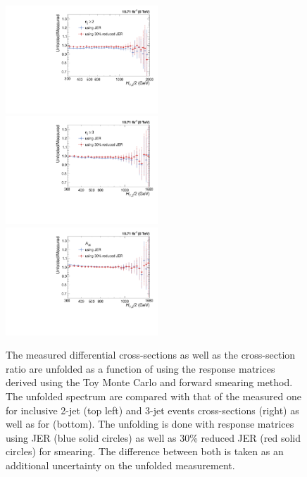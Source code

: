 \begin{figure}[!h]
 \begin{center}
 \hspace*{-3mm}\includegraphics[width=0.51\textwidth]{Plots_HT_2_150/Ratio_Unfolding_data_NLO_2.pdf}%
 ~~\includegraphics[width=0.51\textwidth]{Plots_HT_2_150/Ratio_Unfolding_data_NLO_3.pdf}\\
 \includegraphics[width=0.51\textwidth]{Plots_HT_2_150/Ratio_Unfolding_data_NLO_ratio32.pdf}
 \caption{The measured differential cross-sections as well as the cross-section ratio \ratio are unfolded as a function of \httwo using the response matrices derived using the Toy Monte Carlo and forward smearing method. The unfolded spectrum are compared with that of the measured one for inclusive 2-jet (top left) and 3-jet events cross-sections (right) as well as for \ratio (bottom). The unfolding is done with response matrices using JER (blue solid circles) as well as 30\% reduced JER (red solid circles) for smearing. The difference between both is taken as an additional uncertainty on the unfolded measurement.}
 \label{fig:unfolded_data}
 \end{center}
\end{figure}

